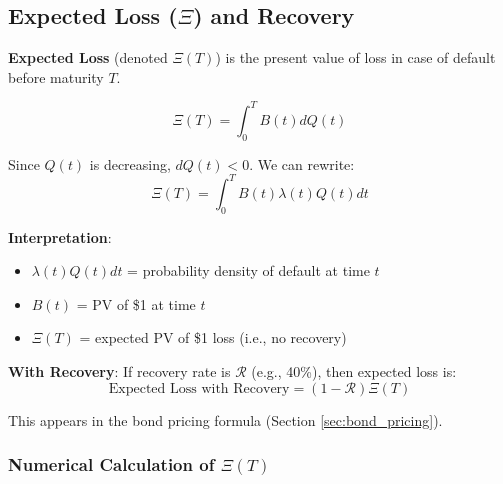 \documentclass[11pt,a4paper]{article}
\begin{document}
\subsection{Expected Loss ($\Xi$) and Recovery}

\begin{keybox}
\textbf{Expected Loss} (denoted $\Xi(T)$) is the present value of loss in case of default before maturity $T$.

\begin{equation}
\Xi(T) = \int_0^T B(t)dQ(t)
\end{equation}

Since $Q(t)$ is decreasing, $dQ(t) < 0$. We can rewrite:
\begin{equation}
\Xi(T) = \int_0^T B(t)\lambda(t)Q(t)dt
\end{equation}

\textbf{Interpretation}:
\begin{itemize}
    \item $\lambda(t)Q(t)dt$ = probability density of default at time $t$
    \item $B(t)$ = PV of \$1 at time $t$
    \item $\Xi(T)$ = expected PV of \$1 loss (i.e., no recovery)
\end{itemize}

\textbf{With Recovery}:
If recovery rate is $\mathcal{R}$ (e.g., 40\%), then expected loss is:
\begin{equation}
\text{Expected Loss with Recovery} = (1 - \mathcal{R}) \Xi(T)
\end{equation}

This appears in the bond pricing formula (Section \ref{sec:bond_pricing}).
\end{keybox}

\subsubsection{Numerical Calculation of $\Xi(T)$}
\end{document}
